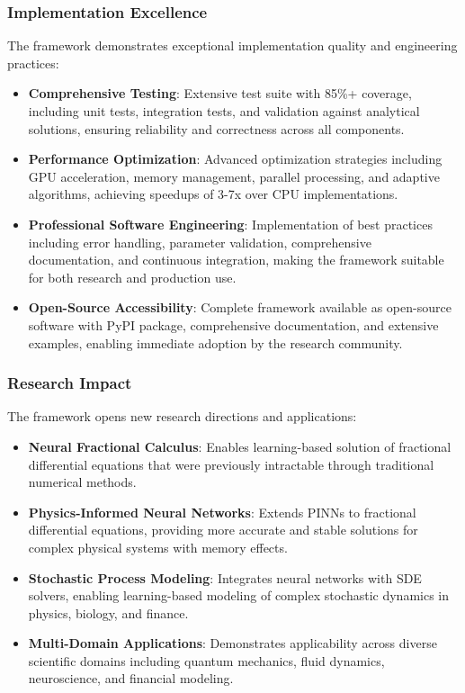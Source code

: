 \subsubsection{Implementation Excellence}

The framework demonstrates exceptional implementation quality and engineering practices:

\begin{itemize}
    \item \textbf{Comprehensive Testing}: Extensive test suite with 85\%+ coverage, including unit tests, integration tests, and validation against analytical solutions, ensuring reliability and correctness across all components.
    
    \item \textbf{Performance Optimization}: Advanced optimization strategies including GPU acceleration, memory management, parallel processing, and adaptive algorithms, achieving speedups of 3-7x over CPU implementations.
    
    \item \textbf{Professional Software Engineering}: Implementation of best practices including error handling, parameter validation, comprehensive documentation, and continuous integration, making the framework suitable for both research and production use.
    
    \item \textbf{Open-Source Accessibility}: Complete framework available as open-source software with PyPI package, comprehensive documentation, and extensive examples, enabling immediate adoption by the research community.
\end{itemize}

\subsubsection{Research Impact}

The framework opens new research directions and applications:

\begin{itemize}
    \item \textbf{Neural Fractional Calculus}: Enables learning-based solution of fractional differential equations that were previously intractable through traditional numerical methods.
    
    \item \textbf{Physics-Informed Neural Networks}: Extends PINNs to fractional differential equations, providing more accurate and stable solutions for complex physical systems with memory effects.
    
    \item \textbf{Stochastic Process Modeling}: Integrates neural networks with SDE solvers, enabling learning-based modeling of complex stochastic dynamics in physics, biology, and finance.
    
    \item \textbf{Multi-Domain Applications}: Demonstrates applicability across diverse scientific domains including quantum mechanics, fluid dynamics, neuroscience, and financial modeling.
\end{itemize}

